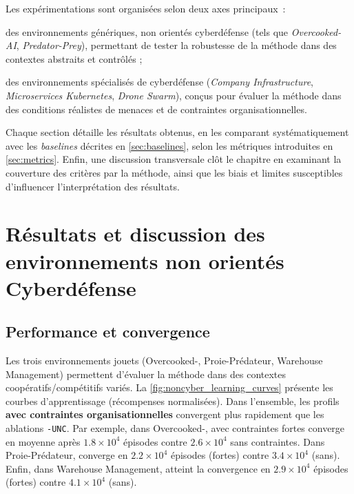 Les expérimentations sont organisées selon deux axes principaux~:
\begin{enumerate*}[label={\roman*)}, itemjoin={; \quad}]
  \item des environnements génériques, non orientés cyberdéfense (tels que \textit{Overcooked-AI}, \textit{Predator-Prey}), permettant de tester la robustesse de la méthode dans des contextes abstraits et contrôlés ;
  \item des environnements spécialisés de cyberdéfense (\textit{Company Infrastructure}, \textit{Microservices Kubernetes}, \textit{Drone Swarm}), conçus pour évaluer la méthode dans des conditions réalistes de menaces et de contraintes organisationnelles.
\end{enumerate*}

Chaque section détaille les résultats obtenus, en les comparant systématiquement avec les \textit{baselines} décrites en \autoref{sec:baselines}, selon les métriques introduites en \autoref{sec:metrics}.
Enfin, une discussion transversale clôt le chapitre en examinant la couverture des critères par la méthode, ainsi que les biais et limites susceptibles d’influencer l’interprétation des résultats.

\section{Résultats et discussion des environnements non orientés Cyberdéfense}\label{sec:results_and_discussion_cyberdefense}

\subsection*{Performance et convergence}

Les trois environnements jouets (Overcooked-, Proie-Prédateur, Warehouse Management) permettent d’évaluer la méthode  dans des contextes coopératifs/compétitifs variés.
La \autoref{fig:noncyber_learning_curves} présente les courbes d’apprentissage (récompenses normalisées).
Dans l’ensemble, les profils \textbf{avec contraintes organisationnelles} convergent plus rapidement que les ablations \texttt{-UNC}.
Par exemple, dans Overcooked-,  avec contraintes fortes converge en moyenne après $1.8\times 10^4$ épisodes contre $2.6\times 10^4$ sans contraintes.
Dans Proie-Prédateur,  converge en $2.2\times 10^4$ épisodes (fortes) contre $3.4\times 10^4$ (sans).
Enfin, dans Warehouse Management,  atteint la convergence en $2.9\times 10^4$ épisodes (fortes) contre $4.1\times 10^4$ (sans).

